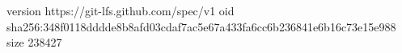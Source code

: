 version https://git-lfs.github.com/spec/v1
oid sha256:348f0118dddde8b8afd03cdaf7ac5e67a433fa6cc6b236841e6b16c73e15e988
size 238427

